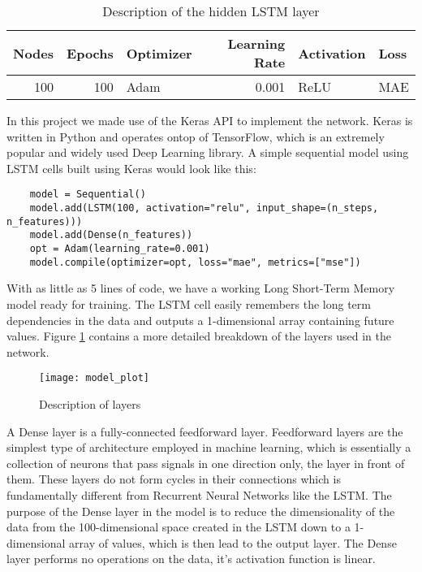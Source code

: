 \begin{table}[h]
    \centering
    \begin{tabular}{|r|r|l|r|l|l|}
        \hline
        \textbf{Nodes} & \textbf{Epochs} & \textbf{Optimizer} & \textbf{Learning Rate} & \textbf{Activation} & \textbf{Loss} \\ \hline
        100            & 100             & Adam               & 0.001                  & ReLU                & MAE           \\ \hline
        \end{tabular}
    \caption{Description of the hidden LSTM layer}
    \label{tab:lstm_layer}
\end{table}

In this project we made use of the Keras API to implement the network. Keras is written in Python and operates ontop of TensorFlow, which is an extremely popular and widely used Deep Learning library\cite{chollet2015keras}. A simple sequential model using LSTM cells built using Keras would look like this:

\begin{verbatim}
    model = Sequential()
    model.add(LSTM(100, activation="relu", input_shape=(n_steps, n_features)))
    model.add(Dense(n_features))
    opt = Adam(learning_rate=0.001)
    model.compile(optimizer=opt, loss="mae", metrics=["mse"])
\end{verbatim}

With as little as 5 lines of code, we have a working Long Short-Term Memory model ready for training. The LSTM cell easily remembers the long term dependencies in the data and outputs a 1-dimensional array containing future values. Figure \ref{tab:layer_description} contains a more detailed breakdown of the layers used in the network.

\begin{figure}[H]
    \centering
    \texttt{[image: model\_plot]}
    \caption{Description of layers}
    \label{tab:layer_description}
\end{figure}

A Dense layer is a fully-connected feedforward layer. Feedforward layers are the simplest type of architecture employed in machine learning, which is essentially a collection of neurons that pass signals in one direction only, the layer in front of them. These layers do not form cycles in their connections which is fundamentally different from Recurrent Neural Networks like the LSTM. The purpose of the Dense layer in the model is to reduce the dimensionality of the data from the 100-dimensional space created in the LSTM down to a 1-dimensional array of values, which is then lead to the output layer. The Dense layer performs no operations on the data, it's activation function is linear.

